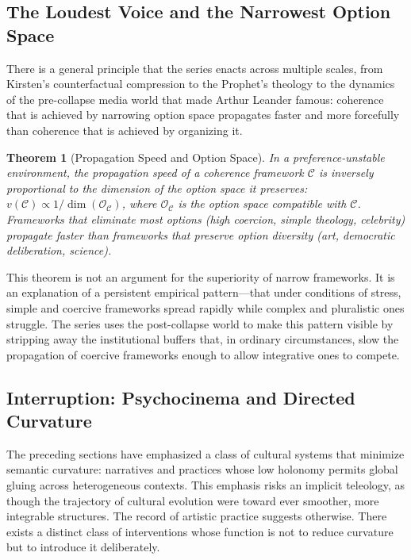 \documentclass[12pt, oneside]{article}
\theoremstyle{plain}
\newtheorem{theorem}{Theorem}[section]
\theoremstyle{definition}
\theoremstyle{remark}
\newcommand{\Opt}{\mathcal{O}}
\newcommand{\CC}{\mathcal{C}}
\begin{document}
\subsection{The Loudest Voice and the Narrowest Option Space}

There is a general principle that the series enacts across multiple
scales, from Kirsten's counterfactual compression to the Prophet's
theology to the dynamics of the pre-collapse media world that made
Arthur Leander famous: coherence that is achieved by narrowing
option space propagates faster and more forcefully than coherence
that is achieved by organizing it.

\begin{theorem}[Propagation Speed and Option Space]
\label{thm:propagation}
In a preference-unstable environment, the propagation speed of
a coherence framework $\CC$ is inversely proportional to the
dimension of the option space it preserves: $v(\CC) \propto
1/\dim(\Opt_\CC)$, where $\Opt_\CC$ is the option space compatible
with $\CC$. Frameworks that eliminate most options (high coercion,
simple theology, celebrity) propagate faster than frameworks that
preserve option diversity (art, democratic deliberation, science).
\end{theorem}

This theorem is not an argument for the superiority of narrow
frameworks. It is an explanation of a persistent empirical
pattern---that under conditions of stress, simple and coercive
frameworks spread rapidly while complex and pluralistic ones
struggle. The series uses the post-collapse world to make this
pattern visible by stripping away the institutional buffers that,
in ordinary circumstances, slow the propagation of coercive
frameworks enough to allow integrative ones to compete.

\subsection{Interruption: Psychocinema and Directed Curvature}

The preceding sections have emphasized a class of cultural systems
that minimize semantic curvature: narratives and practices whose
low holonomy permits global gluing across heterogeneous contexts.
This emphasis risks an implicit teleology, as though the trajectory
of cultural evolution were toward ever smoother, more integrable
structures. The record of artistic practice suggests otherwise.
There exists a distinct class of interventions whose function is
not to reduce curvature but to introduce it deliberately.
\end{document}
